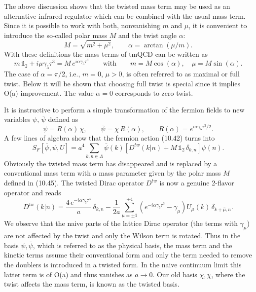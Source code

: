 The above discussion shows that the twisted mass term may be used as an
alternative infrared regulator which can be combined with the usual mass term.
Since it is possible to work with both, nonvanishing $m$ and $\mu$, it is
convenient to introduce the so-called polar mass $M$ and the twist angle
$\alpha$:
\begin{equation}
  M = \sqrt{m^2 + \mu^2} , \qquad \alpha = \arctan(\mu/m) .
\end{equation}
With these definitions the mass terms of tmQCD can be written as
\begin{equation}
  m\,\mathbb{1}_2 + i\mu\gamma_5\tau^3 = M\, e^{i\alpha\gamma_5\tau^3}
  \qquad \text{with} \qquad
  m = M\cos(\alpha) , \quad \mu = M\sin(\alpha) .
\end{equation}
The case of $\alpha = \pi/2$, i.e., $m = 0$, $\mu > 0$, is often referred to
as maximal or full twist. Below it will be shown that choosing full twist is
special since it implies O(a) improvement. The value $\alpha = 0$ corresponds
to zero twist.

It is instructive to perform a simple transformation of the fermion fields to
new variables $\psi$, $\bar\psi$ defined as
\begin{equation}
  \psi = R(\alpha)\,\chi , \qquad \bar\psi = \bar\chi\, R(\alpha) , \qquad
  R(\alpha) = e^{i\alpha\gamma_5\tau^3/2} .
\end{equation}
A few lines of algebra show that the fermion action (10.42) turns into
\begin{equation}
  S_F[\bar\psi, \psi, U] = a^4 \sum_{k,n\in\Lambda}
  \bar\psi(k)\left[D^{tw}(k|n) + M\,\mathbb{1}_2\,\delta_{k,n}\right]\psi(n) .
\end{equation}
Obviously the twisted mass term has disappeared and is replaced by a
conventional mass term with a mass parameter given by the polar mass $M$
defined in (10.45). The twisted Dirac operator $D^{tw}$ is now a genuine
2-flavor operator and reads
\begin{equation}
  D^{tw}(k|n) = \frac{4\,e^{-i\alpha\gamma_5\tau^3}}{a}\,\delta_{k,n}
  - \frac{1}{2a}\sum_{\mu=\pm1}^{\pm4}
  \left(e^{-i\alpha\gamma_5\tau^3} - \gamma_\mu\right)
  U_\mu(k)\, \delta_{k+\hat\mu,n} .
\end{equation}
We observe that the naive parts of the lattice Dirac operator (the terms with
$\gamma_\mu$) are not affected by the twist and only the Wilson term is
rotated. Thus in the basis $\psi, \bar\psi$, which is referred to as the
physical basis, the mass term and the kinetic terms assume their conventional
form and only the term needed to remove the doublers is introduced in a
twisted form. In the naive continuum limit this latter term is of O(a) and
thus vanishes as $a \to 0$. Our old basis $\chi, \bar\chi$, where the twist
affects the mass term, is known as the twisted basis.

